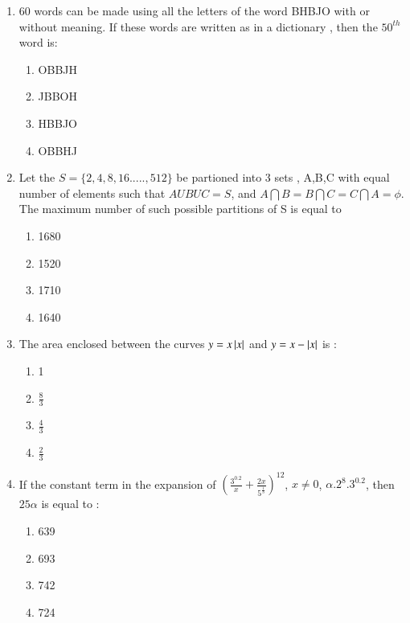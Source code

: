 \documentclass[journal]{IEEEtran}
\begin{document}
\begin{enumerate}
\setcounter{enumi}{0}
 
    \item 60 words can be made using all the letters of the word BHBJO with or without meaning. If these words are written as in a dictionary , then the $50^{th}$ word is:
        \begin{multicols}{4}
            \begin{enumerate}
                \item OBBJH
                \item JBBOH
                \item HBBJO
                \item OBBHJ
            \end{enumerate}
        \end{multicols}

    \item Let the $S=\{2,4,8,16.....,512\}$ be partioned into 3 sets , A,B,C with equal number of elements such that $AUBUC=S$, and $A \bigcap B=B \bigcap C=C \bigcap A=\phi$. The maximum number of such possible partitions of S is equal to


		\begin{multicols}{4}
			\begin{enumerate}
				\item 1680
				\item  1520
				\item 1710
				\item  1640
			\end{enumerate}
		\end{multicols}

    \item The area enclosed between the curves $y=x\left\vert x\right\vert$ and $y=x-\left\vert x\right\vert$ is  :
        \begin{multicols}{4}
            \begin{enumerate}
              \item 1
              \item $\frac{8}{3}$
              \item $\frac{4}{3}$
              \item $\frac{2}{3}$
            \end{enumerate}
        \end{multicols}

    \item If the constant term in the expansion of $(\frac{3^{0.2}}{x}+\frac{2x}{5^\frac{1}{3}})^{12}$, $x \neq 0$, $\alpha .2^{8}.3^{0.2}$, then $25\alpha$ is  equal to :
		\begin{multicols}{4}
			\begin{enumerate}
				\item 639
    \item 693
    \item 742
    \item 724
			\end{enumerate}
		\end{multicols}


\end{enumerate}
\end{document}
